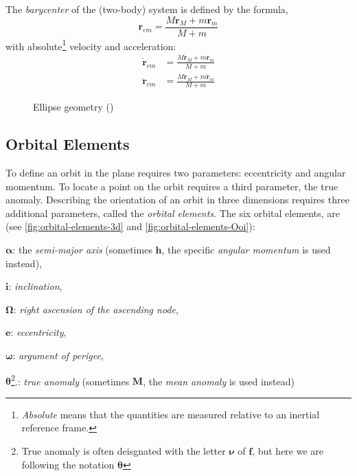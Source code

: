 The \emph{barycenter} of the (two-body) system is defined by the formula,
\begin{equation}\label{eq:curtis22}
  \bm{r}_{cm} = \frac{M \bm{r}_M + m \bm{r}_m }{M + m}
\end{equation}
with absolute\footnote{\emph{Absolute} means that the quantities are measured relative to an inertial reference frame.} 
velocity and acceleration:
\begin{subequations}
  \begin{align}
    \dot{\bm{r}}_{cm} &= \frac{M \dot{\bm{r}}_M + m \dot{\bm{r}}_m }{M + m} \label{eq:curtis23} \\
    \ddot{\bm{r}}_{cm} &= \frac{M \ddot{\bm{r}}_M + m \ddot{\bm{r}}_m }{M + m} \label{eq:curtis24}
  \end{align}
\end{subequations}

\begin{figure}
\centering

\caption{Ellipse geometry (\cite{chobotov})}
\label{fig:ellipse-geometry}
\end{figure}

\subsection{Orbital Elements}
\label{ssec:orbital-elements}
To define an orbit in the plane requires two parameters: eccentricity and angular
momentum. To locate a point on the orbit requires a third parameter, the true 
anomaly. Describing the orientation of an orbit in three dimensions requires 
three additional parameters, called the \emph{orbital elements}. The six 
orbital elements, are (see \ref{fig:orbital-elements-3d} and 
\ref{fig:orbital-elements-Ooi}):
\begin{description}
    \item $\bm{\alpha}$: the \emph{semi-major axis} (sometimes $\bm{h}$, the specific 
    \emph{angular momentum} is used instead),
    \item $\bm{i}$: \emph{inclination},
    \item $\bm{\Omega}$: \emph{right ascension of the ascending node},
    \item $\bm{e}$: \emph{eccentricity},
    \item $\bm{\omega}$: \emph{argument of perigee},
    \item $\bm{\theta}$\footnote{True anomaly is often deisgnated with the letter 
    $\bm{\nu}$ of $\bm{f}$, but here we are following the notation $\bm{\theta}$}.: 
    \emph{true anomaly} (sometimes $\bm{M}$, the \emph{mean anomaly} 
    is used instead)
\end{description}


